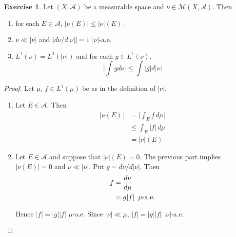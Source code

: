 \documentclass{book}
\theoremstyle{definition}
\newtheorem{ex}[definition]{Exercise}
\newcommand{\MA}{\mathcal{A}}
\newcommand{\MM}{\mathcal{M}}
\newcommand{\lex}[1]{\label{ex:#1}}
\DeclareMathOperator*{\0}{\mbf{0}}
\DeclareMathOperator*{\1}{\mbf{1}}
\newcommand{\dmu}{\, d \mu}
\begin{document}
	\begin{ex} \lex{43009} 
		Let $(X, \MA)$ be a measurable space and $\nu \in \MM(X, \MA)$. Then 
		
		\begin{enumerate}
			\item for each $E \in \MA$, $|\nu(E)| \leq |\nu|(E)$. 
			\item $\nu \ll |\nu|$ and $\big|d \nu /d |\nu|\big| = 1$ $|\nu|$-a.e.
			\item $L^1(\nu) = L^1(|\nu|)$ and for each $g \in L^1(\nu)$, $$ \bigg|\int g d\nu \bigg| \leq \int |g|d |\nu|$$
		\end{enumerate}
	\end{ex}
	
	\begin{proof}
		Let $\mu$, $f \in L^1(\mu)$ be as in the definition of $|\nu|$.
		\begin{enumerate}
			\item Let $E \in \MA$. Then 
			\begin{align*}
				|\nu(E)| 
				& = \bigg|\int_E f \dmu\bigg|\\
				& \leq \int_E |f| \dmu\\
				&= |\nu|(E)
			\end{align*}
			
			\item Let $E \in \MA$ and suppose that $|\nu|(E)=0$. The previous part implies $|\nu(E)|=0$ and $\nu \ll |\nu|$. Put $g = d \nu / d|\nu|$. Then 
			\begin{align*}
				f 
				&= \frac{d\nu}{d\mu}\\
				&= g|f| \hspace{2mm }\mu\text{-a.e.}
			\end{align*}
			
			Hence $|f| = |g||f|$ $\mu$-a.e. Since $|\nu| \ll \mu$, $|f| = |g||f|$ $|\nu|$-a.e.
			

\end{enumerate}
\end{proof}
\end{document}
